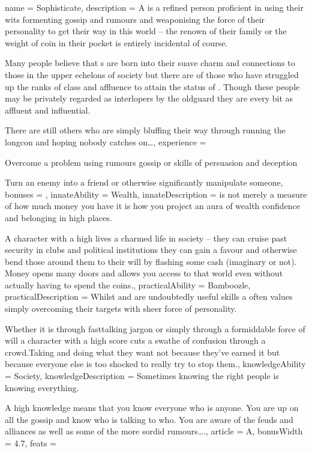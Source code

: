 \archetype
{
	name = Sophisticate,
	description = A \bname{} is a refined person\comma{} proficient in using their wits\comma{} formenting gossip and rumours\comma{} and weaponising the force of their personality to get their way in this world – the renown of their family\comma{} or the weight of coin in their pocket is entirely incidental\comma{} of course. 

Many people believe that \name{}s are born into their suave\comma{} charm and connections to those in the upper echelons of society\comma{} but there are of those who have struggled up the ranks of class and affluence to attain the status of \bname{}. Though these people may be privately regarded as interlopers by the old\minus{}guard\comma{} they are every bit as affluent and influential. 

There are still others who are simply bluffing their way through\comma{} running the long\minus{}con and hoping nobody catches on…,
	experience = \item Overcome a  problem using rumours\comma{} gossip or skills of persuasion and deception
\item Turn an enemy into a friend\comma{} or otherwise significantly manipulate someone,
	bonuses = 
,
	innateAbility = Wealth,
	innateDescription =  is not merely a measure of how much money you have\comma{} it is how you project an aura of wealth\comma{} confidence and belonging in high places. 

A character with a high  lives a charmed life in society – they can cruise past security in clubs and political institutions\comma{} they can gain a favour and otherwise bend those around them to their will by flashing some cash (imaginary or not). Money opens many doors\comma{} and  allows you access to that world\comma{} even without actually having to spend the coins.,
	practicalAbility = Bamboozle,
	practicalDescription = Whilst \comma{}  and  are undoubtedly useful skills\comma{} a \bname{} often values simply overcoming their targets with sheer force of personality. 

Whether it is through fast\minus{}talking jargon\comma{} or simply through a formiddable force of will\comma{} a character with a high  score cuts a swathe of confusion through a crowd.Taking and doing what they want not because they’ve earned it\comma{} but because everyone else is too shocked to really try to stop them.,
	knowledgeAbility = Society,
	knowledgeDescription = Sometimes\comma{} knowing the right people is knowing everything. 

A high  knowledge means that you know everyone who is anyone. You are up on all the gossip and know who is talking to who. You are aware of the feuds and alliances\comma{} as well as some of the more sordid rumours….,
	article = A,
	bonusWidth = 4.7, feats = \SophisticateFeats
}

